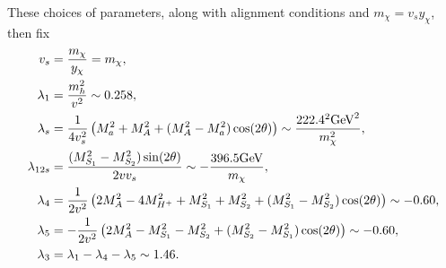 These choices of parameters, along with alignment conditions and $m_\chi = v_s y_\chi$, then fix
\begin{align}
    v_s &= \frac{m_\chi}{y_\chi} = m_\chi, \\
    \lambda_1 &= \frac{m_h^2}{v^2} \sim 0.258, \\
    \lambda_{s} &= \frac{1}{4 v_s^2} \left( M_{a}^2 + M_A^2 +(M_A^2 - M_a^2) \cos (2\theta ) \right) \sim \frac{222.4^2\textrm{GeV}^2}{m_\chi^2}, \\
    \lambda_{12s} &= \frac{(M_{S_1}^2 - M_{S_2}^2) \sin (2\theta)}{2 v v_s} \sim -\frac{396.5 \textrm{GeV}}{m_\chi},\\
    \lambda_4 &= \frac{1}{2v^2} \left( 2 M_{A}^2 - 4 M_{H^+}^2 + M_{S_1}^2 + M_{S_2}^2 + (M_{S_1}^2 - M_{S_2}^2) \cos (2 \theta ) \right) \sim -0.60, \\
    \lambda_5 &= -\frac{1}{2v^2} \left( 2 M_{A}^2 - M_{S_1}^2 - M_{S_2}^2 + (M_{S_2}^2 - M_{S_1}^2) \cos (2 \theta ) \right) \sim -0.60, \\
    \lambda_3 &= \lambda_1 - \lambda_4 - \lambda_5 \sim  1.46.
\end{align}

